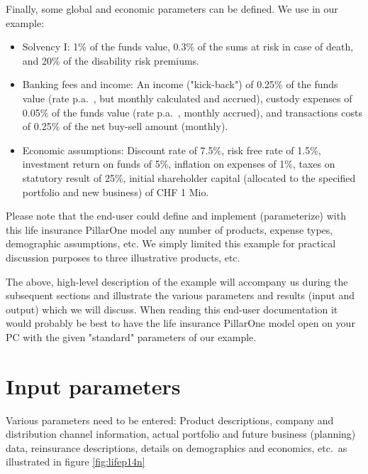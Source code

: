 Finally, some global and economic parameters can be defined. We use in our example:
\begin{itemize}
	\item Solvency I: 1\% of the funds value, 0.3\% of the sums at risk in case of death, and 20\% of the disability risk premiums.
	\item Banking fees and income: An income ("kick-back") of 0.25\% of the funds value (rate p.a.~, but monthly calculated and accrued), custody expenses of 0.05\% of the funds value (rate p.a.~, monthly accrued), and transactions costs of 0.25\% of the net buy-sell amount (monthly).
	\item Economic assumptions: Discount rate of 7.5\%, risk free rate of 1.5\%, investment return on funds of 5\%, inflation on expenses of 1\%, taxes on statutory result of 25\%, initial shareholder capital (allocated to the specified portfolio and new business) of CHF 1 Mio.
\end{itemize}

Please note that the end-user could define and implement (parameterize) with this life insurance PillarOne model any number of products, expense types, demographic assumptions, etc. We simply limited this example for practical discussion purposes to three illustrative products, etc.

The above, high-level description of the example will accompany us during the subsequent sections and illustrate the various parameters and results (input and output) which we will discuss. When reading this end-user documentation it would probably be best to have the life insurance PillarOne model open on your PC with the given "standard" parameters of our example.

\section{Input parameters}

Various parameters need to be entered: Product descriptions, company and distribution channel information, actual portfolio and future business (planning) data, reinsurance descriptions, details on demographics and economics, etc.~as illustrated in figure \ref{fig:lifep14n}

